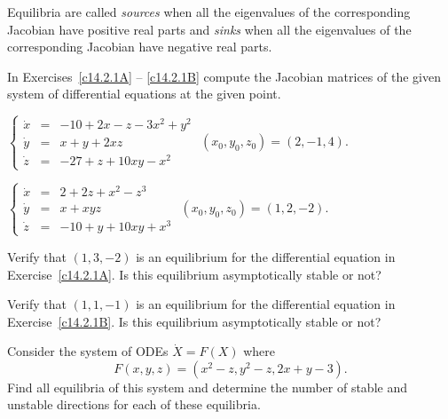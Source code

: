 \documentclass{ximera}
\begin{document}
Equilibria are called {\em sources\/} when all the eigenvalues 
of the corresponding Jacobian have positive real parts and 
{\em sinks\/} when all the eigenvalues of the corresponding 
Jacobian have negative real parts.



\EXER

\TEXER  

\noindent In Exercises~\ref{c14.2.1A} -- \ref{c14.2.1B} compute the Jacobian 
matrices of the given system of differential equations at the given point.
\begin{exercise} \label{c14.2.1A}
$\left\{\begin{array}{rcl} 
\dot{x} & = & -10 + 2x - z - 3x^2+y^2 \\
\dot{y} & = & x + y + 2xz \\
\dot{z} & = & -27 + z + 10xy - x^2  \end{array}\right.$ 
\AND $(x_0,y_0,z_0) = (2,-1,4)$.
\end{exercise}
\begin{exercise} \label{c14.2.1B}
$\left\{\begin{array}{rcl} 
\dot{x} & = & 2 + 2z + x^2 - z^3 \\
\dot{y} & = & x + xyz \\
\dot{z} & = & -10 + y + 10xy + x^3  \end{array}\right.$ 
\AND $(x_0,y_0,z_0) = (1,2,-2)$.
\end{exercise}

\begin{exercise} \label{c14.2.1C}
Verify that $(1,3,-2)$ is an equilibrium for the differential equation in 
Exercise~\ref{c14.2.1A}.  Is this equilibrium asymptotically stable or not?
\end{exercise}

\begin{exercise} \label{c14.2.1D}
Verify that $(1,1,-1)$ is an equilibrium for the differential equation in 
Exercise~\ref{c14.2.1B}.  Is this equilibrium asymptotically stable or not?
\end{exercise}

\begin{exercise} \label{c14.2.1E}
Consider the system of ODEs $\dot{X}=F(X)$ where
\[
F(x,y,z) = (x^2 - z, y^2 - z, 2x + y - 3).
\]
Find all equilibria of this system and determine the number of stable and 
unstable directions for each of these equilibria.
\end{exercise}
\end{document}
